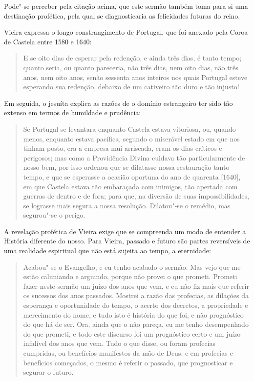 Pode"-se perceber pela citação acima, que este sermão também toma para si
uma destinação profética, pela qual se diagnosticaria as felicidades
futuras do reino.

Vieira expressa o longo constrangimento de Portugal, que foi anexado
pela Coroa de Castela entre 1580 e 1640:

\begin{quote}
E se oito dias de esperar pela redenção, e ainda três dias, é tanto
tempo; quanto seria, ou quanto pareceria, não três dias, nem oito dias,
não três anos, nem oito anos, senão sessenta anos inteiros nos quais
Portugal esteve esperando sua redenção, debaixo de um cativeiro tão duro
e tão injusto!
\end{quote}

Em seguida, o jesuíta explica as razões de o domínio estrangeiro ter
sido tão extenso em termos de humildade e prudência:

\begin{quote}
Se Portugal se levantara enquanto Castela estava vitoriosa, ou, quando
menos, enquanto estava pacífica, segundo o miserável estado em que nos
tinham posto, era a empresa mui arriscada, eram os dias críticos e
perigosos; mas como a Providência Divina cuidava tão particularmente de
nosso bem, por isso ordenou que se dilatasse nossa restauração tanto
tempo, e que se esperasse a ocasião oportuna do ano de quarenta
{[}1640{]}, em que Castela estava tão embaraçada com inimigos, tão
apertada com guerras de dentro e de fora; para que, na diversão de suas
impossibilidades, se lograsse mais segura a nossa resolução. Dilatou"-se
o remédio, mas segurou"-se o perigo.
\end{quote}

A revelação profética de Vieira exige que se compreenda um modo de
entender a História diferente do nosso. Para Vieira, passado e futuro
são partes reversíveis de uma realidade espiritual que não está sujeita
ao tempo, a eternidade:

\begin{quote}
Acabou"-se o Evangelho, e eu tenho acabado o sermão. Mas vejo que me
estão caluniando e arguindo, porque não provei o que prometi. Prometi
fazer neste sermão um juízo dos anos que vem, e eu não fiz mais que
referir os sucessos dos anos passados. Mostrei a razão das profecias, as
dilações da esperança e oportunidade do tempo, o acerto dos decretos, a
propriedade e merecimento do nome, e tudo isto é história do que foi, e
não prognóstico do que há de ser. Ora, ainda que o não pareça, eu me
tenho desempenhado do que prometi, e todo este discurso foi um
prognóstico certo e um juízo infalível dos anos que vem. Tudo o que
disse, ou foram profecias cumpridas, ou benefícios manifestos da mão de
Deus: e em profecias e benefícios começados, o mesmo é referir o
passado, que prognosticar e segurar o futuro.
\end{quote}

